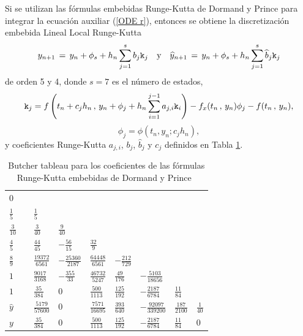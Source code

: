 Si se utilizan las fórmulas embebidas Runge-Kutta de Dormand y Prince para integrar la ecuación auxiliar (\ref{ODE r}), entonces se obtiene la discretización embebida Lineal Local Runge-Kutta~\cite{Jimenez14AMC}
\begin{equation}
y_{n+1}\,=\,y_n+\phi_s+h_n \sum_{j=1}^{s}b_j \mathtt{k}_j \quad \text{y} \quad
\widehat{y}_{n+1}\,=\, y_n+\phi_s+h_n \sum_{j=1}^{s}\widehat{b}_j \mathtt{k}_j
\label{LLDP-scheme-dp}
\end{equation}
de orden 5 y 4, donde $s = 7$ es el número de estados,
\[ \mathtt{k}_j = f\left( t_n+c_jh_n\, , \, y_n+\phi_j+h_n \sum_{i=1}^{j-1}a_{j,i}\mathtt{k}_i \right)  
- f_x(t_n\, , \, y_n)\phi_j - f(t_n\, ,\, y_n),\]
\[ \phi _j = \phi \left( t_{n},y_{n};c_jh_{n}\right), \]
y coeficientes Runge-Kutta $a_{j,i}$, $b_j$, $\hat{b}_j$ y $c_j$ definidos en Tabla \ref{ButcherTabla}.


\begin{table}[h]
	\caption{Butcher tableau para los coeficientes de las fórmulas Runge-Kutta embebidas de Dormand y Prince~\cite{hairer1993solving}} \label{ButcherTabla}
	\begin{center}
		\begin{tabular}{ l@{\vrule height 5pt depth 10pt width 0pt}|lllllll}
			$0$ & \\
			$\frac{1}{5}\quad$ & $\frac{1}{5}$ \\
			$\frac{3}{10}\quad$ & $\frac{3}{40}$ & $\frac{9}{40}$ \\
			$\frac{4}{5}\quad$ & $\frac{44}{45}$ & $-\frac{56}{15}$ & $\frac{32}{9}$ \\
			$\frac{8}{9}\quad$ & $\frac{19372}{6561}$ & $-\frac{25360}{2187}$ & $\frac{64448}{6561}$ & $-\frac{212}{729}$ \\
			$1\quad$ & $\frac{9017}{3168}$ & $-\frac{355}{33}$ & $\frac{46732}{5247}$ & $\frac{49}{176}$
			& $-\frac{5103}{18656}$ \\
			$1\quad$ & $\frac{35}{384}$ & $0$ & $\frac{500}{1113}$ & $\frac{125}{192}$
			& $-\frac{2187}{6784}$ & $\frac{11}{84}$ \\
			\hline
			$\widehat{y}$ & $\frac{5179}{57600}$ & $0$ & $\frac{7571}{16695}$ & $\frac{393}{640}$
			& $-\frac{92097}{339200}$ & $\frac{187}{2100}$ & $\frac{1}{40}$
			\rule[-0.3cm]{0cm}{0.8cm} \\
			$y$ & $\frac{35}{384}$ & $0$ & $\frac{500}{1113}$ & $\frac{125}{192}$
			& $-\frac{2187}{6784}$ & $\frac{11}{84}$ & $0$
		\end{tabular}
	\end{center}
\end{table}

